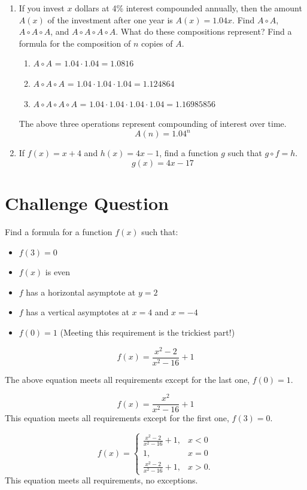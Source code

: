 \documentclass{article}
\begin{document}
\begin{enumerate}
\begin{enumerate}
	\end{enumerate}
\setcounter{enumi}{59}
\item If you invest $x$ dollars at 4\% interest compounded annually, then the amount $A(x)$ of the investment after one year is $A(x)=1.04x$. Find $A\circ A$, $A  \circ A  \circ A$, and $A \circ  A \circ  A \circ  A$. What do these compositions represent? Find a formula for the composition of $n$ copies of $A$.
	\begin{enumerate}
		\item $A\circ A$ = $1.04\cdot 1.04 = 1.0816$
		\item $A  \circ A  \circ A$ = $1.04\cdot 1.04\cdot 1.04 = 1.124864$
		\item $A \circ  A \circ  A \circ  A$ = $1.04\cdot 1.04\cdot 1.04\cdot 1.04 = 1.16985856$
	\end{enumerate}
	The above three operations represent compounding of interest over time.
	$$A(n)=1.04^n$$
\setcounter{enumi}{61}
\item If $f(x)=x+4$ and $h(x)=4x-1$, find a function $g$ such that $g \circ f=h$.
\newline $$g(x)=4x-17$$
\end{enumerate}

\section{Challenge Question}
Find a formula for a function $f(x)$ such that:
\begin{itemize}
\item $f(3)=0$
\item $f(x)$ is even
\item $f$ has a horizontal asymptote at $y=2$
\item $f$ has a vertical asymptotes at $x=4$ and $x=-4$
\item $f(0)=1$ (Meeting this requirement is the trickiest part!) 
\end{itemize}

$$f(x)=\frac{x^2-2}{x^2-16}+1$$
\begin{center}
The above equation meets all requirements except for the last one, $f(0)=1$.

$$f(x)=\frac{x^2}{x^2-16}+1$$
This equation meets all requirements except for the first one, $f(3)=0$.

$$f(x)=\begin{cases} 
      		\frac{x^2-2}{x^2-16}+1, & x < 0 \\
      		1, & x = 0 \\
      		\frac{x^2-2}{x^2-16}+1, & x > 0.
   		\end{cases}$$
This equation meets all requirements, no exceptions.

\end{center}
\end{document}
